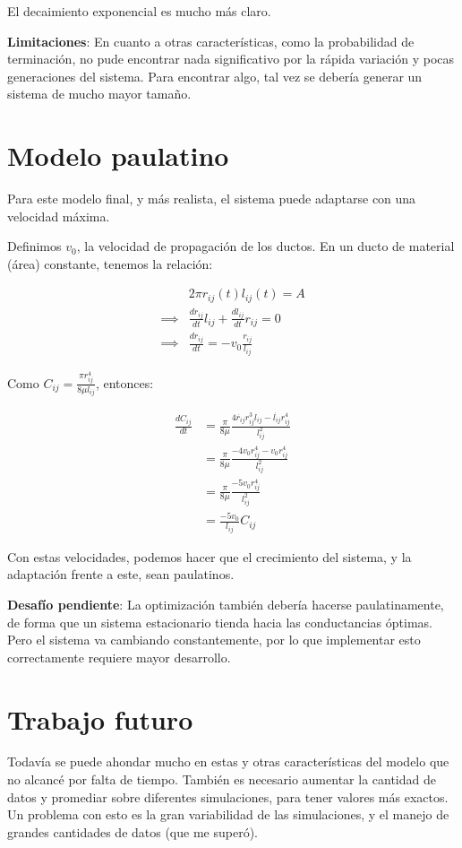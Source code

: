 \documentclass{article}
\begin{document}
El decaimiento exponencial es mucho más claro.

\textbf{Limitaciones}: En cuanto a otras características, como la probabilidad de terminación, no pude encontrar nada significativo por la rápida variación y pocas generaciones del sistema. Para encontrar algo, tal vez se debería generar un sistema de mucho mayor tamaño.

\section{Modelo paulatino}

Para este modelo final, y más realista, el sistema puede adaptarse con una velocidad máxima.

Definimos $v_0$, la velocidad de propagación de los ductos. En un ducto de material (área) constante, tenemos la relación:

\begin{align*}
    & 2\pi r_{ij}(t) l_{ij}(t) = A \\
    \implies & \frac{d r_{ij}}{dt} l_{ij} + \frac{d l_{ij}}{dt} r_{ij} = 0 \\
    \implies & \frac{d r_{ij}}{dt} = - v_0 \frac{r_{ij}}{l_{ij}}
\end{align*}

Como $C_{ij} = \frac{\pi r_{ij}^4}{8\mu l_{ij}}$, entonces:

\begin{align*}
    \frac{d C_{ij}}{dt} & = \frac{\pi}{8\mu} \frac{4 \dot{r_{ij}}r_{ij}^{3} l_{ij} - \dot{l_{ij}}r_{ij}^{4}}{l_{ij}^{2}}\\
    & = \frac{\pi}{8\mu} \frac{- 4v_0 r_{ij}^{4} - v_0 r_{ij}^{4}}{l_{ij}^{2}} \\
    & = \frac{\pi}{8\mu} \frac{- 5v_0 r_{ij}^{4}}{l_{ij}^{2}} \\
    & = \frac{-5 v_0}{l_{ij}} C_{ij}
\end{align*}

Con estas velocidades, podemos hacer que el crecimiento del sistema, y la adaptación frente a este, sean paulatinos.

\textbf{Desafío pendiente}: La optimización también debería hacerse paulatinamente, de forma que un sistema estacionario tienda hacia las conductancias óptimas. Pero el sistema va cambiando constantemente, por lo que implementar esto correctamente requiere mayor desarrollo.

\section{Trabajo futuro}

Todavía se puede ahondar mucho en estas y otras características del modelo que no alcancé por falta de tiempo. También es necesario aumentar la cantidad de datos y promediar sobre diferentes simulaciones, para tener valores más exactos.
Un problema con esto es la gran variabilidad de las simulaciones, y el manejo de grandes cantidades de datos (que me superó).
\end{document}
